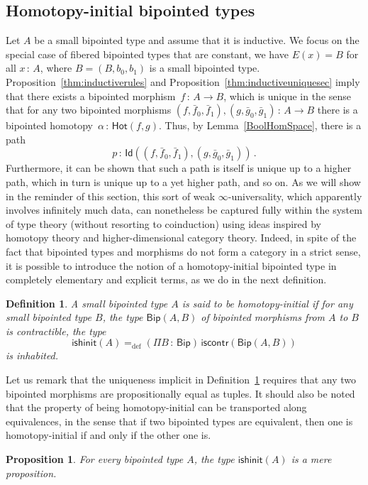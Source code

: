\documentclass[10pt,a4paper,oneside,reqno]{amsart}
\numberwithin{equation}{section}
\theoremstyle{mythm}
\newtheorem{proposition}[theorem]{Proposition}
\theoremstyle{mydef}
\newtheorem{definition}[theorem]{Definition}
\theoremstyle{myrmk}
\newcommand{\ie}{\text{i.e.\ }}
\newcommand{\defeq}{=_{\mathrm{def}}}
\newcommand{\co}{\,{:}\,}
\newcommand{\iscontr}{\mathsf{iscontr}}
\newcommand{\ishinit}{\mathsf{ishinit}}
\newcommand{\Hot}{\mathsf{Hot}}
\newcommand{\Id}{\mathsf{Id}}
\newcommand{\Bip}{\mathsf{Bip}}
\newcommand{\BipHom}{\mathsf{Bip}}
\begin{document}
\subsection*{Homotopy-initial bipointed types} 
 Let $A$ be a small bipointed type and assume that it is inductive. 
 We focus on the special case of fibered bipointed types that 
are constant, \ie we have $E(x) = B$ for all $x \co A$, where $B = (B, b_0, b_1)$  is
a small bipointed type. 
 Proposition~\ref{thm:inductiverules} and Proposition~\ref{thm:inductiveuniquesec}
imply that there exists a bipointed morphism~$f \co A \to B$, which is unique in the sense that  for any two bipointed morphisms $(f, \bar{f}_0, \bar{f}_1), (g, \bar{g}_0, \bar{g}_1) \co A \to B$  there is a bipointed 
homotopy~$\alpha \co \Hot(f, g)$. Thus, by Lemma~\ref{BoolHomSpace}, there is a path 
\[
p \co \Id((f, \bar{f}_0, \bar{f}_1), (g, \bar{g}_0, \bar{g}_1)) \, .
\] 
Furthermore, it can be shown that such a path is itself is unique up to a higher path, which in turn is unique up to a yet higher path, and so on. As we will show in the reminder of this section, this sort of weak $\infty$-universality, which apparently involves infinitely much data, can nonetheless be captured fully within the system of type theory (without resorting to coinduction) using ideas inspired by homotopy theory and higher-dimensional category theory. Indeed, in spite of the fact that bipointed types and morphisms do not form a category in a strict sense, it is possible to introduce the  notion of a homotopy-initial bipointed type in completely elementary and explicit terms, as we do in the next definition.


\begin{definition}\label{def:BoolInit}
A small bipointed type $A$ is said to be \emph{homotopy-initial}  if for any small bipointed type $B$, the type $\BipHom(A,B)$ of bipointed morphisms from $A$ to $B$
is contractible, \ie the type
\[
\ishinit(A) \defeq (\Pi B \co \Bip) \, \iscontr(\BipHom(A, B) )
\] 
is inhabited.
\end{definition}

Let us remark that the uniqueness implicit in Definition~\ref{def:BoolInit} requires that any two bipointed morphisms are propositionally equal as tuples. It should also be noted that the property of being  homotopy-initial  can be transported along equivalences, in the sense that if two bipointed types are equivalent, then one is homotopy-initial if and only if the other one is.  

\begin{proposition} \label{thm:isbiphinitishprop} For every bipointed type $A$, the type $\ishinit(A)$ is a mere proposition.
\end{proposition}
\end{document}
